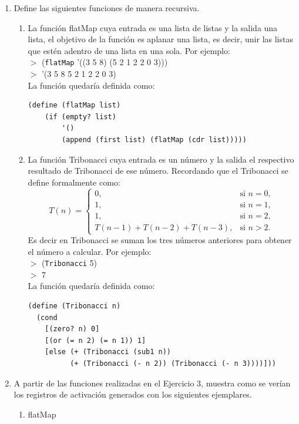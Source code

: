\documentclass[11pt]{article}
\begin{document}
\begin{enumerate}[leftmargin=0.8cm]
    \item Define las siguientes funciones de manera recursiva.
    \begin{enumerate}
        \item La función flatMap cuya entrada es una lista de listas y la salida una lista, el objetivo de la función es aplanar una lista, es decir, unir las listas que estén adentro de una lista en una sola. Por ejemplo:\\
        $>$ (\texttt{flatMap} '((3 5 8) (5 2 1 2 2 0 3)))\\
        $>$ '(3 5 8 5 2 1 2 2 0 3)\\
        La función quedaría definida como:
        \begin{lstlisting}
(define (flatMap list)
    (if (empty? list)
        '()
        (append (first list) (flatMap (cdr list)))))
        \end{lstlisting}
        \item La función Tribonacci cuya entrada es un número y la salida el respectivo resultado de Tribonacci de ese número. Recordando que el Tribonacci se define formalmente como:
        \[
            T(n) = \left\{ \begin{array}{ll}
                0, & \text{si } n= 0,\\
                1, & \text{si } n= 1,\\
                1, & \text{si } n= 2,\\
                T(n-1) + T(n-2) + T(n-3), & \text{si } n > 2.
            \end{array}\right.
        \]
        Es decir en Tribonacci se suman los tres números anteriores para obtener el número a calcular. Por ejemplo:\\
        $>$ (\texttt{Tribonacci} 5)\\
        $>$ 7\\
        La función quedaría definida como:
        \begin{lstlisting}
(define (Tribonacci n)
  (cond
    [(zero? n) 0]
    [(or (= n 2) (= n 1)) 1]
    [else (+ (Tribonacci (sub1 n)) 
          (+ (Tribonacci (- n 2)) (Tribonacci (- n 3))))]))
        \end{lstlisting}
    \end{enumerate}
    \item A partir de las funciones realizadas en el Ejercicio 3, muestra como se verían los registros de activación generados con los siguientes ejemplares.
    \begin{enumerate}
        \item flatMap\\

\end{enumerate}
\end{enumerate}
\end{document}
